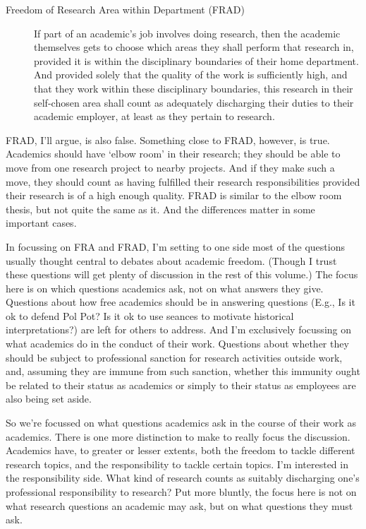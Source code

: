 \documentclass[
  11pt,
  letterpaper,
  DIV=11,
  numbers=noendperiod]{scrartcl}
\begin{document}
\begin{description}
\item[Freedom of Research Area within Department (FRAD)]
If part of an academic's job involves doing research, then the academic
themselves gets to choose which areas they shall perform that research
in, provided it is within the disciplinary boundaries of their home
department. And provided solely that the quality of the work is
sufficiently high, and that they work within these disciplinary
boundaries, this research in their self-chosen area shall count as
adequately discharging their duties to their academic employer, at least
as they pertain to research.
\end{description}

FRAD, I'll argue, is also false. Something close to FRAD, however, is
true. Academics should have `elbow room' in their research; they should
be able to move from one research project to nearby projects. And if
they make such a move, they should count as having fulfilled their
research responsibilities provided their research is of a high enough
quality. FRAD is similar to the elbow room thesis, but not quite the
same as it. And the differences matter in some important cases.

In focussing on FRA and FRAD, I'm setting to one side most of the
questions usually thought central to debates about academic freedom.
(Though I trust these questions will get plenty of discussion in the
rest of this volume.) The focus here is on which questions academics
ask, not on what answers they give. Questions about how free academics
should be in answering questions (E.g., Is it ok to defend Pol Pot? Is
it ok to use seances to motivate historical interpretations?) are left
for others to address. And I'm exclusively focussing on what academics
do in the conduct of their work. Questions about whether they should be
subject to professional sanction for research activities outside work,
and, assuming they are immune from such sanction, whether this immunity
ought be related to their status as academics or simply to their status
as employees are also being set aside.

So we're focussed on what questions academics ask in the course of their
work as academics. There is one more distinction to make to really focus
the discussion. Academics have, to greater or lesser extents, both the
freedom to tackle different research topics, and the responsibility to
tackle certain topics. I'm interested in the responsibility side. What
kind of research counts as suitably discharging one's professional
responsibility to research? Put more bluntly, the focus here is not on
what research questions an academic may ask, but on what questions they
must ask.
\end{document}
